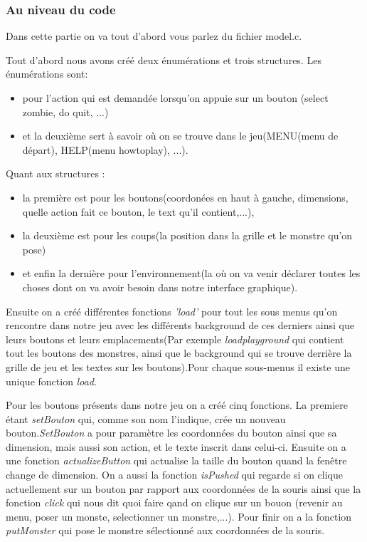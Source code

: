 \documentclass[12]{article}
\begin{document}
\subsubsection{Au niveau du code}
Dans cette partie on va tout d'abord vous parlez du fichier model.c.

Tout d'abord nous avons créé deux énumérations et trois structures. Les énumérations sont:
\begin{itemize}
\item pour l'action qui est demandée lorsqu'on appuie sur un bouton (select zombie, do quit, ...)
\item et la deuxième sert à savoir où on se trouve dans le jeu(MENU(menu de départ), HELP(menu howtoplay), ...).
\end{itemize}
Quant aux structures :
\begin{itemize}
\item la première est pour les boutons(coordonées en haut à gauche, dimensions, quelle action fait ce bouton, le text qu'il contient,...),
\item la deuxième est pour les coups(la position dans la grille et le monstre qu'on pose)
\item et enfin la dernière pour l'environnement(la où on va venir déclarer toutes les choses dont on va avoir besoin dans notre interface graphique).
\end{itemize}

Ensuite on a créé différentes fonctions \textit{'load'} pour tout les sous menus qu'on rencontre dans notre jeu avec les différents background de ces derniers ainsi que leurs boutons et leurs emplacements(Par exemple \textit{loadplayground} qui contient tout les boutons des monstres, ainsi que le background qui se trouve derrière la grille de jeu et les textes sur les boutons).Pour chaque sous-menus il existe une unique fonction \textit{load}.


Pour les boutons présents dans notre jeu on a créé cinq fonctions. La premiere étant \textit{setBouton} qui, comme son nom l'indique, crée un nouveau bouton.\textit{SetBouton} a pour paramètre les coordonnées du bouton ainsi que sa dimension, mais aussi son action, et le texte inscrit dans celui-ci. Ensuite on a une fonction \textit{actualizeButton} qui actualise la taille du bouton quand la fenêtre change de dimension.
On a aussi la fonction \textit{isPushed} qui regarde si on clique actuellement sur un bouton par rapport aux coordonnées de la souris ainsi que la fonction \textit{click} qui nous dit quoi faire qand on clique sur un bouon (revenir au menu, poser un monste, selectionner un monstre,...).
Pour finir on a la fonction \textit{putMonster} qui pose le monstre sélectionné aux coordonnées de la souris.
\end{document}
